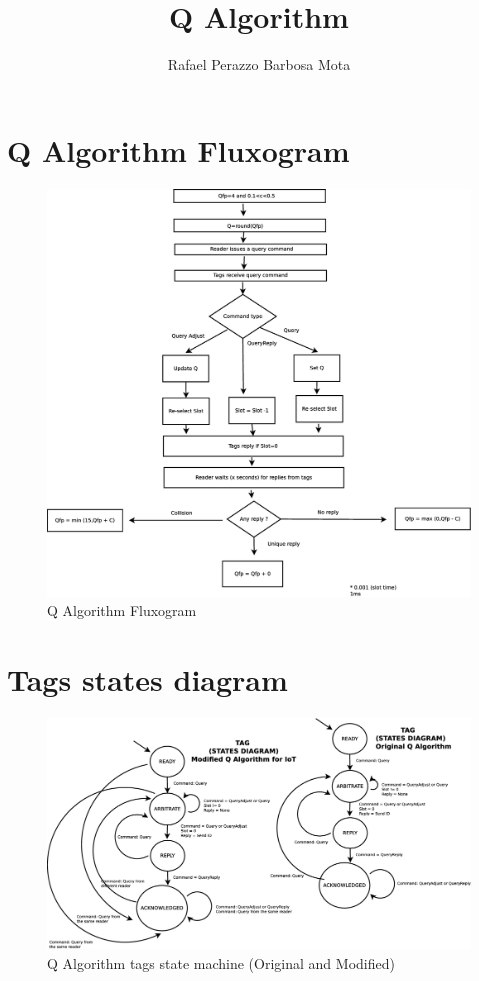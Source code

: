 \documentclass[10pt,a4paper]{article}
\author{Rafael Perazzo Barbosa Mota}
\title{Q Algorithm}
\begin{document}
\maketitle

\section{Q Algorithm Fluxogram}

\begin{figure}[!htb]
\centering
\includegraphics[scale=0.25]{imagens/QAlgorithm.eps}
\caption{ {\small Q Algorithm Fluxogram}}
\label{fig:1}
\end{figure}	

\section{Tags states diagram}

\begin{figure}[!htb]
\centering
\includegraphics[scale=0.25]{imagens/QAlgorithm_StateDiagram.eps}
\caption{ {\small Q Algorithm tags state machine (Original and Modified)}}
\label{fig:2}
\end{figure}	
\end{document}
